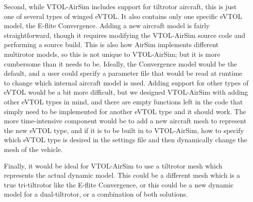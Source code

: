 Second, while VTOL-AirSim includes support for tiltrotor aircraft, this is just one of several types of winged eVTOL. It also contains only one specific eVTOL model, the E-flite Convergence. Adding a new aircraft model is fairly straightforward, though it requires modifying the VTOL-AirSim source code and performing a source build. This is also how AirSim implements different multirotor models, so this is not unique to VTOL-AirSim; but it is more cumbersome than it needs to be. Ideally, the Convergence model would be the default, and a user could specify a parameter file that would be read at runtime to change which internal aircraft model is used. Adding support for other types of eVTOL would be a bit more difficult, but we designed VTOL-AirSim with adding other eVTOL types in mind, and there are empty functions left in the code that simply need to be implemented for another eVTOL type and it should work. The more time-intensive component would be to add a new aircraft mesh to represent the new eVTOL type, and if it is to be built in to VTOL-AirSim, how to specify which eVTOL type is desired in the settings file and then dynamically change the mesh of the vehicle.

Finally, it would be ideal for VTOL-AirSim to use a tiltrotor mesh which represents the actual dynamic model. This could be a different mesh which is a true tri-tiltrotor like the E-flite Convergence, or this could be a new dynamic model for a dual-tiltrotor, or a combination of both solutions.
